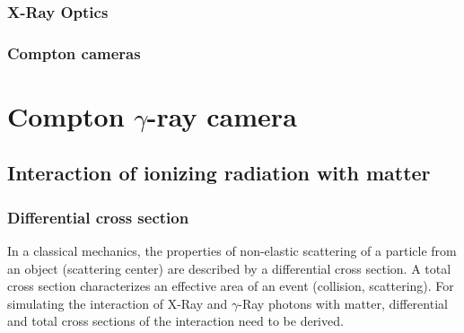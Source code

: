 \documentclass[a4paper,11pt,titlepage,twoside]{book}
\begin{document}
\subsection{X-Ray Optics}

\subsection{Compton cameras}




\chapter{Compton $\gamma$-ray camera}


\section{Interaction of ionizing radiation with matter}


\subsection{Differential cross section}


In a classical mechanics, the properties of non-elastic scattering of a particle from an object (scattering center) are described by a differential cross section.
A total cross section characterizes an effective area of an event (collision, scattering).
For simulating the interaction of X-Ray and $\gamma$-Ray photons with matter, differential and total cross sections of the interaction need to be derived.
\end{document}
